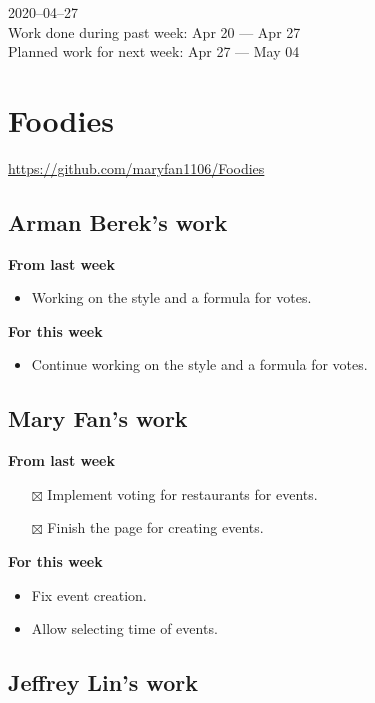 \documentclass[12pt,letterpaper]{article}
\newcommand{\done}{$\boxtimes$}
\begin{document}
2020--04--27 \\
Work done during past week: Apr 20 --- Apr 27 \\
Planned work for next week: Apr 27 --- May 04

\section*{Foodies}
\url{https://github.com/maryfan1106/Foodies}

\subsection*{Arman Berek's work}

\textbf{From last week}
\begin{itemize}
  \item Working on the style and a formula for votes.
\end{itemize}


\textbf{For this week}
\begin{itemize}
  \item Continue working on the style and a formula for votes.
\end{itemize}


\subsection*{Mary Fan's work}

\textbf{From last week}
\begin{itemize}
  \item[\done] Implement voting for restaurants for events.
  \item[\done] Finish the page for creating events.
\end{itemize}


\textbf{For this week}
\begin{itemize}
  \item Fix event creation.
  \item Allow selecting time of events.
\end{itemize}


\subsection*{Jeffrey Lin's work}
\end{document}
